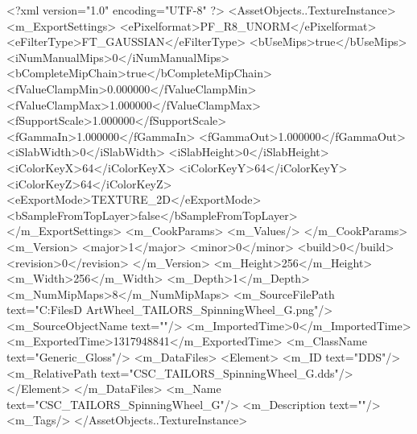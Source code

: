 <?xml version="1.0" encoding="UTF-8" ?>
<AssetObjects..TextureInstance>
	<m_ExportSettings>
		<ePixelformat>PF_R8_UNORM</ePixelformat>
		<eFilterType>FT_GAUSSIAN</eFilterType>
		<bUseMips>true</bUseMips>
		<iNumManualMips>0</iNumManualMips>
		<bCompleteMipChain>true</bCompleteMipChain>
		<fValueClampMin>0.000000</fValueClampMin>
		<fValueClampMax>1.000000</fValueClampMax>
		<fSupportScale>1.000000</fSupportScale>
		<fGammaIn>1.000000</fGammaIn>
		<fGammaOut>1.000000</fGammaOut>
		<iSlabWidth>0</iSlabWidth>
		<iSlabHeight>0</iSlabHeight>
		<iColorKeyX>64</iColorKeyX>
		<iColorKeyY>64</iColorKeyY>
		<iColorKeyZ>64</iColorKeyZ>
		<eExportMode>TEXTURE_2D</eExportMode>
		<bSampleFromTopLayer>false</bSampleFromTopLayer>
	</m_ExportSettings>
	<m_CookParams>
		<m_Values/>
	</m_CookParams>
	<m_Version>
		<major>1</major>
		<minor>0</minor>
		<build>0</build>
		<revision>0</revision>
	</m_Version>
	<m_Height>256</m_Height>
	<m_Width>256</m_Width>
	<m_Depth>1</m_Depth>
	<m_NumMipMaps>8</m_NumMipMaps>
	<m_SourceFilePath text="C:\Users\Shadow\Desktop\Working Files\3D Art\Props\Tailors\Spinning Wheel\CSC_TAILORS_SpinningWheel_G.png"/>
	<m_SourceObjectName text=""/>
	<m_ImportedTime>0</m_ImportedTime>
	<m_ExportedTime>1317948841</m_ExportedTime>
	<m_ClassName text="Generic_Gloss"/>
	<m_DataFiles>
		<Element>
			<m_ID text="DDS"/>
			<m_RelativePath text="CSC_TAILORS_SpinningWheel_G.dds"/>
		</Element>
	</m_DataFiles>
	<m_Name text="CSC_TAILORS_SpinningWheel_G"/>
	<m_Description text=""/>
	<m_Tags/>
</AssetObjects..TextureInstance>

